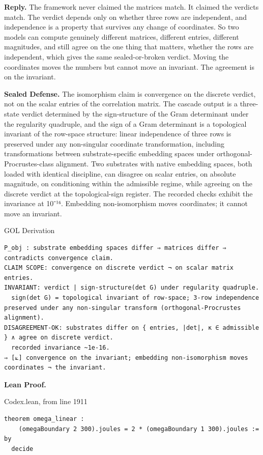 \documentclass[10pt,twocolumn]{article}
\begin{document}
\textbf{Reply.} The framework never claimed the matrices match. It
claimed the verdicts match. The verdict depends only on whether three
rows are independent, and independence is a property that survives any
change of coordinates. So two models can compute genuinely different
matrices, different entries, different magnitudes, and still agree on
the one thing that matters, whether the rows are independent, which
gives the same sealed-or-broken verdict. Moving the coordinates moves
the numbers but cannot move an invariant. The agreement is on the
invariant.

\textbf{Sealed Defense.} The isomorphism claim is convergence on the
discrete verdict, not on the scalar entries of the correlation matrix.
The cascade output is a three-state verdict determined by the
sign-structure of the Gram determinant under the regularity quadruple,
and the sign of a Gram determinant is a topological invariant of the
row-space structure: linear independence of three rows is preserved
under any non-singular coordinate transformation, including
transformations between substrate-specific embedding spaces under
orthogonal-Procrustes-class alignment. Two substrates with native
embedding spaces, both loaded with identical discipline, can disagree on
scalar entries, on absolute magnitude, on conditioning within the
admissible regime, while agreeing on the discrete verdict at the
topological-sign register. The recorded checks exhibit the invariance at
10⁻¹⁶. Embedding non-isomorphism moves coordinates; it cannot move an
invariant.

\begin{golbox}{GOL Derivation}
\begin{lstlisting}[style=golv]
P_obj : substrate embedding spaces differ ⇒ matrices differ ⇒ contradicts convergence claim.
CLAIM SCOPE: convergence on discrete verdict ¬ on scalar matrix entries.
INVARIANT: verdict | sign-structure(det G) under regularity quadruple.
  sign(det G) = topological invariant of row-space; 3-row independence preserved under any non-singular transform (orthogonal-Procrustes alignment).
DISAGREEMENT-OK: substrates differ on { entries, |det|, κ ∈ admissible } ∧ agree on discrete verdict.
  recorded invariance ~1e-16.
⇒ [⟀] convergence on the invariant; embedding non-isomorphism moves coordinates ¬ the invariant.
\end{lstlisting}
\end{golbox}

\textbf{Lean Proof.}

\begin{leanexcerpt}{Codex.lean, from line 1911}
\begin{lstlisting}[style=leanx,firstnumber=1911]
theorem omega_linear :
    (omegaBoundary 2 300).joules = 2 * (omegaBoundary 1 300).joules := by
  decide
\end{lstlisting}
\end{leanexcerpt}
\end{document}
